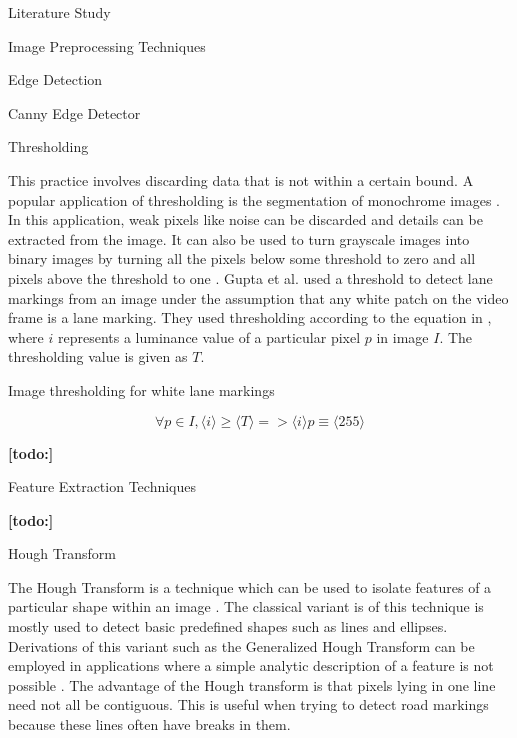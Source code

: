 \documentclass{matthijs}
\begin{document}
\begin{hoofdstuk}{Literature Study}
\begin{paragraaf}{Image Preprocessing Techniques}
\begin{subparagraaf}{Edge Detection}
\begin{subsubparagraaf}{Canny Edge Detector}
				\end{subsubparagraaf}

			\end{subparagraaf}

			\begin{subparagraaf}{Thresholding}

				This practice involves discarding data that is not within a certain bound.
				A popular application of thresholding is the segmentation of monochrome images \cite{humaidi2018fpga}.
				In this application, weak pixels like noise can be discarded and details can be extracted from the image.
				It can also be used to turn grayscale images into binary images by turning all the pixels below some threshold to zero and all pixels above the threshold to one \cite{morse2000thresholding}.
				Gupta et al. \cite{gupta2016automated} used a threshold to detect lane markings from an image under the assumption that any white patch on the video frame is a lane marking.
				They used thresholding according to the equation in , where $i$ represents a luminance value of a particular pixel $p$ in image $I$.
				The thresholding value is given as $T$.

				\begin{figuur}{Image thresholding for white lane markings}

					\begin{equation*}
						\forall p \in I,\langle i \rangle \geq \langle T \rangle => \langle i \rangle p \equiv \langle 255 \rangle
					\end{equation*}\cite{gupta2016automated}

				\end{figuur}

				\textbf{[todo:]}

			\end{subparagraaf}

		\end{paragraaf}

		\begin{paragraaf}{Feature Extraction Techniques}

			\textbf{[todo:]}

			\begin{subparagraaf}{Hough Transform}

				The Hough Transform is a technique which can be used to isolate features of a particular shape within an image \cite{fisher2003hypermedia}.
				The classical variant is of this technique is mostly used to detect basic predefined shapes such as lines and ellipses.
				Derivations of this variant such as the Generalized Hough Transform can be employed in applications where a simple analytic description of a feature is not possible \cite{fisher2003hypermedia}.
				The advantage of the Hough transform is that pixels lying in one line need not all be contiguous.\cite{kahl2000hough}
				This is useful when trying to detect road markings because these lines often have breaks in them.


\end{subparagraaf}
\end{paragraaf}
\end{hoofdstuk}
\end{document}
